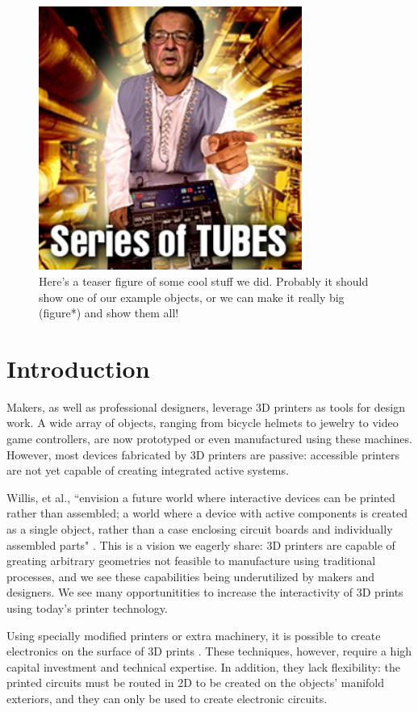 \begin{figure}[h]
\centering
    \includegraphics[width=3.4in]{figures/series-of-tubes.jpg}
\caption{Here's a teaser figure of some cool stuff we did. Probably it should show one of our example objects, or we can make it really big (figure*) and show them all!}
\label{fig:teaser}
\end{figure}

\section{Introduction}
Makers, as well as professional designers, leverage 3D printers as tools for design work.  A wide array of objects, ranging from bicycle helmets to jewelry to video game controllers, are now prototyped or even manufactured using these machines.  However, most devices fabricated by 3D printers are passive: accessible printers are not yet capable of creating integrated active systems.

Willis, et al., ``envision a future world where interactive devices can be printed rather than assembled; a world where a device with active components is created as a single object, rather than a case enclosing circuit boards and individually assembled parts" \cite{Willis-printedoptics}.  This is a vision we eagerly share: 3D printers are capable of greating arbitrary geometries not feasible to manufacture using traditional processes, and we see these capabilities being underutilized by makers and designers.  We see many opportunitities to increase the interactivity of 3D prints using today's printer technology.

Using specially modified printers or extra machinery, it is possible to create electronics on the surface of 3D prints \cite{optomec} \cite{Sells-reprap}.  These techniques, however, require a high capital investment and technical expertise.  In addition, they lack flexibility: the printed circuits must be routed in 2D to be created on the objects' manifold exteriors, and they can only be used to create electronic circuits.   

